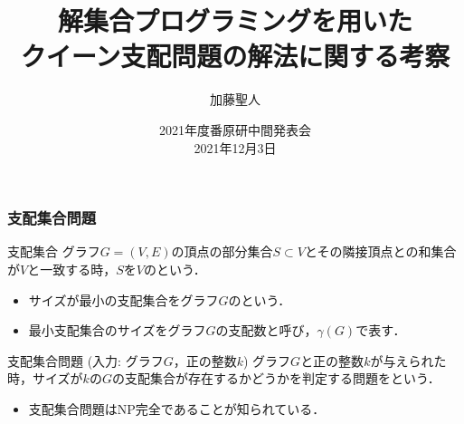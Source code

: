 \documentclass[dvipdfmx,10pt]{beamer}
\begin{document}
\title{解集合プログラミングを用いた\\クイーン支配問題の解法に関する考察}
\author{加藤聖人}
\date{2021年度番原研中間発表会\\2021年12月3日}

%
%

\begin{frame}\frametitle{}
 \titlepage
\end{frame}

%
%

\begin{frame}\frametitle{支配集合問題}
 \begin{block}{支配集合}
  グラフ$G=(V,E)$の頂点の部分集合$S\subset V$とその隣接頂点との和集合が$V$と一致する時，$S$を$V$のという．
  \begin{itemize}
   \item サイズが最小の支配集合をグラフ$G$のという．
   \item 最小支配集合のサイズをグラフ$G$の\alert{支配数}と呼び，$\gamma (G)$で表す．
  \end{itemize}
 \end{block}
 \begin{block}{支配集合問題 (入力: グラフ$G$，正の整数$k$)}
  グラフ$G$と正の整数$k$が与えられた時，サイズが$k$の$G$の支配集合が存在するかどうかを判定する問題をという．
  \begin{itemize}
   \item 支配集合問題はNP完全であることが知られている．
  \end{itemize}
 \end{block}
\end{frame}

%
%
\end{document}
